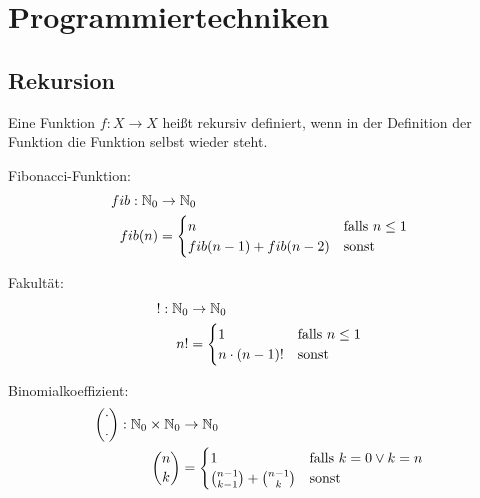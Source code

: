 \chapter{Programmiertechniken}
\section{Rekursion}

\begin{definition}
    Eine Funktion $f: X \rightarrow X$ heißt rekursiv definiert,
    wenn in der Definition der Funktion die Funktion selbst wieder
    steht.
\end{definition}

\begin{beispiel}
    \begin{bspenum}
        \item Fibonacci-Funktion:
                \begin{align*}
                    fib: \mathbb{N}_0 &\rightarrow \mathbb{N}_0\\
                    fib(n) &= \begin{cases}
                            n                   &\text{falls } n \leq 1\\
                            fib(n-1) + fib(n-2) &\text{sonst}
                        \end{cases}
                \end{align*}
        \item Fakultät:
                \begin{align*}
                    !: \mathbb{N}_0 &\rightarrow \mathbb{N}_0\\
                    n! &= \begin{cases}
                            1              &\text{falls } n \leq 1\\
                            n\cdot (n-1)!  &\text{sonst}
                        \end{cases}
                \end{align*}
        \item \label{bsp:binomialkoeffizient} Binomialkoeffizient:
                \begin{align*}
                    \binom{\cdot}{\cdot}: \mathbb{N}_0 \times \mathbb{N}_0 &\rightarrow \mathbb{N}_0\\
                            \binom{n}{k}    &= \begin{cases}
                        1                               &\text{falls } k=0 \lor k = n\\
                        \binom{n-1}{k-1}+\binom{n-1}{k} &\text{sonst}
                        \end{cases}
                \end{align*}
    \end{bspenum}
\end{beispiel}

